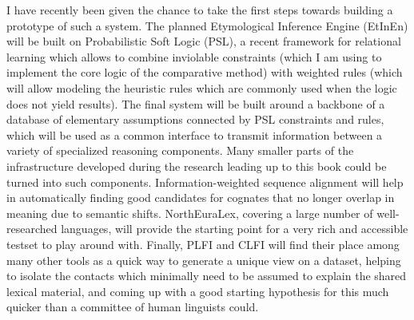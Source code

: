 I have recently been given the chance to take the first steps towards building a prototype of such a system. The planned Etymological Inference Engine (EtInEn) will be built on Probabilistic Soft Logic (PSL), a recent framework for relational learning which allows to combine inviolable constraints (which I am using to implement the core logic of the comparative method) with weighted rules (which will allow modeling the heuristic rules which are commonly used when the logic does not yield results). The final system will be built around a backbone of a database of elementary assumptions connected by PSL constraints and rules, which will be used as a common interface to transmit information between a variety of specialized reasoning components. Many smaller parts of the infrastructure developed during the research leading up to this book could be turned into such components.  Information-weighted sequence alignment will help in automatically finding good candidates for cognates that no longer overlap in meaning due to semantic shifts. NorthEuraLex, covering a large number of well-researched languages, will provide the starting point for a very rich and accessible testset to play around with. Finally, PLFI and CLFI will find their place among many other tools as a quick way to generate a unique view on a dataset, helping to isolate the contacts which minimally need to be assumed to explain the shared lexical material, and coming up with a good starting hypothesis for this much quicker than a committee of human linguists could.
